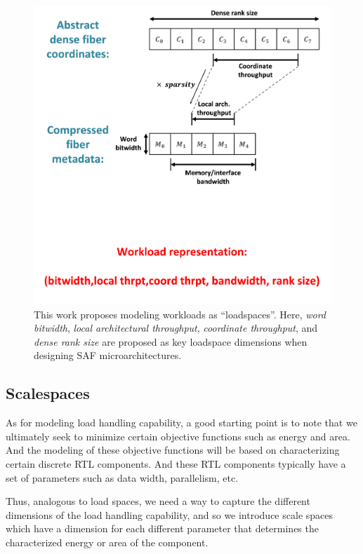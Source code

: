 \begin{itemize}
\begin{figure}[H]
    \centering
    \includegraphics[width=\linewidth]{figures/workload_representation.png}
    \caption{This work proposes modeling workloads as ``loadspaces''. Here, \textit{word bitwidth},  \textit{local architectural throughput}, \textit{coordinate throughput}, and \textit{dense rank size} are proposed as key loadspace dimensions when designing SAF microarchitectures.}
    \label{fig:workload_representation}
\end{figure}

\subsection{Scalespaces}

As for modeling load handling capability, a good starting point is to note that we ultimately seek to minimize certain objective functions such as energy and area. And the modeling of these objective functions will be based on characterizing certain discrete RTL components. And these RTL components typically have a set of parameters such as data width, parallelism, etc.

Thus, analogous to load spaces, we need a way to capture the different dimensions of the load handling capability, and so we introduce scale spaces which have a dimension for each different parameter that determines the characterized energy or area of the component.


\end{itemize}
